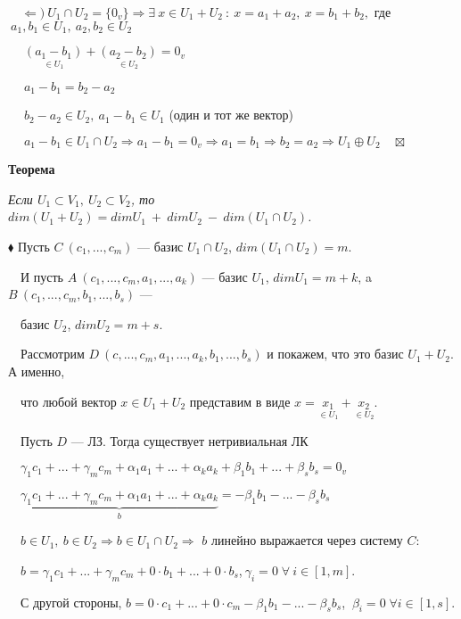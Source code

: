 \documentclass[a4paper, 12pt]{report}
\begin{document}
\begin{enumerate}
		$\quad \Leftarrow )\ U_1\cap U_2 = \{0_v\} \Rightarrow \exists \ x\in U_1 + U_2\ : \ x=a_1 + a_2, \ x = b_1 + b_2,$ где $\ a_1,b_1 \in U_1, \ a_2,b_2 \in U_2$
		
		$\quad \; \underset{\in U_1}{(a_1 - b_1)} + \underset{\in U_2}{(a_2 - b_2)} = 0_v$
		
		$\quad \; a_1 - b_1 = b_2 - a_2$
		
		$\quad \; b_2 - a_2\in U_2, \ a_1 - b_1 \in U_1$ (один и тот же вектор)
		
		$\quad \; a_1 - b_1\in U_1\cap U_2 \Rightarrow a_1 - b_1 = 0_v \Rightarrow a_1 = b_1 \Rightarrow b_2 = a_2 \Rightarrow U_1 \oplus U_2 \quad \boxtimes$
		
	\end{enumerate}\par\bigskip\textbf{Теорема}
	
	\textit{Если $U_1\subset V_1, \ U_2\subset V_2$, то $dim(U_1 + U_2) = dim U_1\  +\  dim U_2\  -\  dim (U_1 \cap U_2)$.}
	\par\bigskip
	$\blacklozenge$ Пусть $C\ (c_1,...,c_m)$ --- базис $U_1\cap U_2$, $dim(U_1\cap U_2) = m$.
	
	$\quad$И пусть $A\ (c_1,...,c_m,a_1,..., a_k)$ --- базис $U_1$, $dim U_1 = m+k$,
	a $B\ (c_1,...,c_m,b_1,..., b_s)$ --- 
	
	$\quad$базис $U_2$, $dim U_2 = m+s$.
	
	$\quad$Рассмотрим $D\ (c,...,c_m,a_1,...,a_k,b_1,...,b_s)$ и покажем, что это базис $U_1 + U_2$. А именно, 
	
	$\quad$что любой вектор $x\in U_1 + U_2$ представим в виде $x=\underset{\in U_1}{x_1} + \underset{\in U_2}{x_2}$.
	
	$\quad$Пусть $D$ --- ЛЗ. Тогда существует нетривиальная ЛК
	
	$\quad \gamma_1 c_1 +...+\gamma_m c_m +\alpha_1 a_1 + ... + \alpha_k a_k + \beta_1 b_1 + ...+\beta_s b_s = 0_v$
	
	$\quad \underbrace{\gamma_1 c_1 +...+\gamma_m c_m +\alpha_1 a_1 + ... + \alpha_k a_k}_b = -\beta_1 b_1 - ...-\beta_s b_s$
	
	$\quad b\in U_1,\  b\in U_2 \Rightarrow b\in U_1\cap U_2 \Rightarrow$ $b$ линейно выражается через систему $C$:
	
	$\quad b = \gamma_1 c_1 +...+\gamma_m c_m + 0\cdot b_1 + ... + 0\cdot  b_s$,$\  \gamma_i = 0 \; \forall\  i\in[1,m] $.
	
	$\quad$С другой стороны, $b = 0\cdot c_1+...+0\cdot c_m - \beta_1 b_1 - ... -\beta_s b_s$, $\  \beta_i = 0\; \forall i\in[1,s]$.
	
\end{document}
